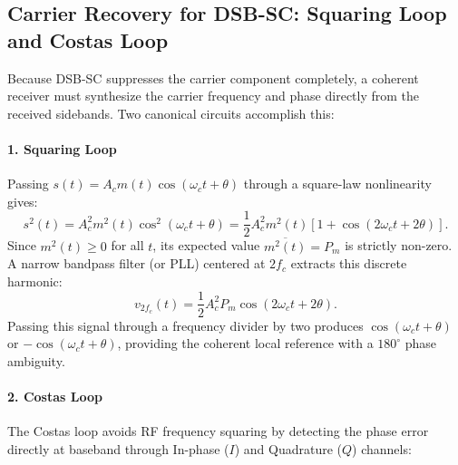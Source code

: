 \documentclass[12pt,a4paper]{article}
\begin{document}
\subsection{Carrier Recovery for DSB-SC: Squaring Loop and Costas Loop}
Because DSB-SC suppresses the carrier component completely, a coherent receiver must synthesize the carrier frequency and phase directly from the received sidebands. Two canonical circuits accomplish this:

\paragraph{1. Squaring Loop}
Passing $s(t)=A_cm(t)\cos(\omega_ct+\theta)$ through a square-law nonlinearity gives:
\[
s^2(t)=A_c^2m^2(t)\cos^2(\omega_ct+\theta)=\frac{1}{2}A_c^2m^2(t)\left[1+\cos(2\omega_ct+2\theta)\right].
\]
Since $m^2(t)\ge 0$ for all $t$, its expected value $\overline{m^2(t)}=P_m$ is strictly non-zero. A narrow bandpass filter (or PLL) centered at $2f_c$ extracts this discrete harmonic:
\[
v_{2f_c}(t)=\frac{1}{2}A_c^2P_m\cos(2\omega_ct+2\theta).
\]
Passing this signal through a frequency divider by two produces $\cos(\omega_ct+\theta)$ or $-\cos(\omega_ct+\theta)$, providing the coherent local reference with a $180^\circ$ phase ambiguity.

\paragraph{2. Costas Loop}
The Costas loop avoids RF frequency squaring by detecting the phase error directly at baseband through In-phase ($I$) and Quadrature ($Q$) channels:
\end{document}
